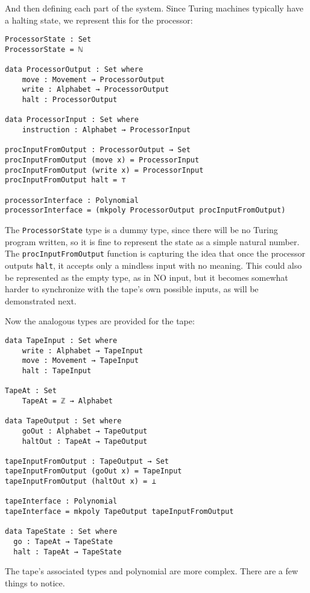 And then defining each part of the system. Since Turing machines typically have a halting state, we represent this for the processor:
\begin{verbatim}
ProcessorState : Set
ProcessorState = ℕ 

data ProcessorOutput : Set where
    move : Movement → ProcessorOutput
    write : Alphabet → ProcessorOutput
    halt : ProcessorOutput

data ProcessorInput : Set where
    instruction : Alphabet → ProcessorInput

procInputFromOutput : ProcessorOutput → Set
procInputFromOutput (move x) = ProcessorInput
procInputFromOutput (write x) = ProcessorInput
procInputFromOutput halt = ⊤

processorInterface : Polynomial
processorInterface = (mkpoly ProcessorOutput procInputFromOutput)
\end{verbatim}

The \texttt{ProcessorState} type is a dummy type, since there will be no Turing program written, so it is fine to represent the state as a simple natural number. The \texttt{procInputFromOutput} function is capturing the idea that once the processor outputs \texttt{halt}, it accepts only a mindless input with no meaning. This could also be represented as the empty type, as in NO input, but it becomes somewhat harder to synchronize with the tape's own possible inputs, as will be demonstrated next.

Now the analogous types are provided for the tape:

\begin{verbatim}
data TapeInput : Set where
    write : Alphabet → TapeInput
    move : Movement → TapeInput
    halt : TapeInput
    
TapeAt : Set
    TapeAt = ℤ → Alphabet
  
data TapeOutput : Set where
    goOut : Alphabet → TapeOutput
    haltOut : TapeAt → TapeOutput
  
tapeInputFromOutput : TapeOutput → Set
tapeInputFromOutput (goOut x) = TapeInput
tapeInputFromOutput (haltOut x) = ⊥
  
tapeInterface : Polynomial
tapeInterface = mkpoly TapeOutput tapeInputFromOutput

data TapeState : Set where
  go : TapeAt → TapeState
  halt : TapeAt → TapeState
\end{verbatim}

The tape's associated types and polynomial are more complex. There are a few things to notice.

